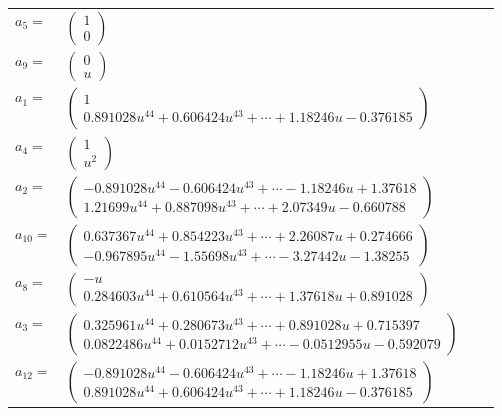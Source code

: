 \documentclass[1p]{elsarticle_modified}
\theoremstyle{definition}
\begin{document}
\begin{tabular}{m{7pt} m{180pt} m{7pt} m{180pt} }
\flushright $a_{5}=$&$\begin{pmatrix}1\\0\end{pmatrix}$ \\
\flushright $a_{9}=$&$\begin{pmatrix}0\\u\end{pmatrix}$ \\
\flushright $a_{1}=$&$\begin{pmatrix}1\\0.891028 u^{44}+0.606424 u^{43}+\cdots+1.18246 u-0.376185\end{pmatrix}$ \\
\flushright $a_{4}=$&$\begin{pmatrix}1\\u^2\end{pmatrix}$ \\
\flushright $a_{2}=$&$\begin{pmatrix}-0.891028 u^{44}-0.606424 u^{43}+\cdots-1.18246 u+1.37618\\1.21699 u^{44}+0.887098 u^{43}+\cdots+2.07349 u-0.660788\end{pmatrix}$ \\
\flushright $a_{10}=$&$\begin{pmatrix}0.637367 u^{44}+0.854223 u^{43}+\cdots+2.26087 u+0.274666\\-0.967895 u^{44}-1.55698 u^{43}+\cdots-3.27442 u-1.38255\end{pmatrix}$ \\
\flushright $a_{8}=$&$\begin{pmatrix}- u\\0.284603 u^{44}+0.610564 u^{43}+\cdots+1.37618 u+0.891028\end{pmatrix}$ \\
\flushright $a_{3}=$&$\begin{pmatrix}0.325961 u^{44}+0.280673 u^{43}+\cdots+0.891028 u+0.715397\\0.0822486 u^{44}+0.0152712 u^{43}+\cdots-0.0512955 u-0.592079\end{pmatrix}$ \\
\flushright $a_{12}=$&$\begin{pmatrix}-0.891028 u^{44}-0.606424 u^{43}+\cdots-1.18246 u+1.37618\\0.891028 u^{44}+0.606424 u^{43}+\cdots+1.18246 u-0.376185\end{pmatrix}$ \\

\end{tabular}
\end{document}
